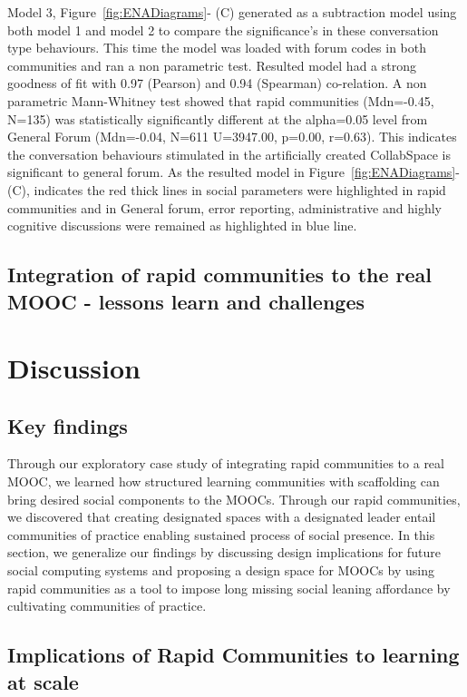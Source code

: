 \documentclass[manuscript,screen,review]{acmart}
\begin{document}
Model 3, Figure~\ref{fig:ENADiagrams}- (C) generated as a subtraction model using both model 1 and model 2 to compare the significance's in these conversation type behaviours. This time the model was loaded with forum codes in both communities and ran a non parametric test. Resulted model had a strong goodness of fit with 0.97 (Pearson) and 0.94 (Spearman) co-relation. A non parametric Mann-Whitney test showed that rapid communities (Mdn=-0.45, N=135) was statistically significantly different at the alpha=0.05 level from General Forum (Mdn=-0.04, N=611 U=3947.00, p=0.00, r=0.63). This indicates the conversation behaviours stimulated in the artificially created CollabSpace is significant to general forum. As the resulted model in Figure~\ref{fig:ENADiagrams}-(C), indicates the red thick lines in social parameters were highlighted in rapid communities and in General forum, error reporting, administrative and highly cognitive discussions were remained as highlighted in blue line.

\subsection{Integration of rapid communities to the real MOOC - lessons learn and challenges}




\section{Discussion}
\subsection{Key findings}
Through our exploratory case study of integrating rapid communities to a real MOOC, we learned how structured learning communities with scaffolding can bring desired social components to the MOOCs. Through our rapid communities, we discovered that creating designated spaces with a designated leader entail communities of practice enabling sustained process of social presence.  In this section, we generalize our findings by discussing design implications for future social computing systems and proposing a design space for  MOOCs by using rapid communities as a tool to impose long missing social leaning affordance by cultivating communities of practice. 

\subsection{Implications of Rapid Communities to learning at scale}
\end{document}
